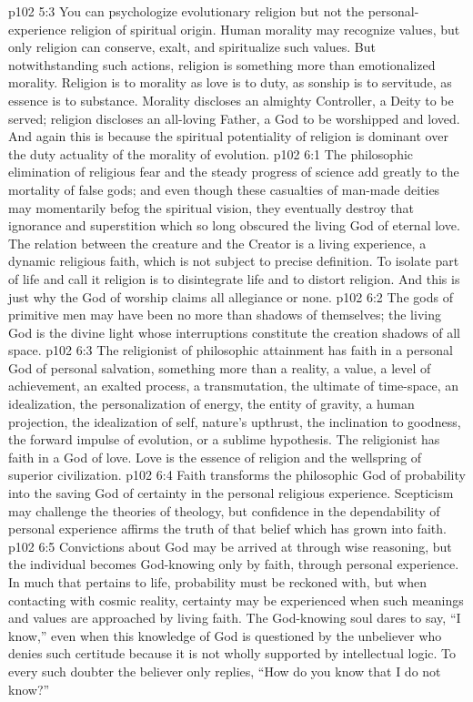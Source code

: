 \vs p102 5:3 You can psychologize evolutionary religion but not the personal\hyp{}experience religion of spiritual origin. Human morality may recognize values, but only religion can conserve, exalt, and spiritualize such values. But notwithstanding such actions, religion is something more than emotionalized morality. Religion is to morality as love is to duty, as sonship is to servitude, as essence is to substance. Morality discloses an almighty Controller, a Deity to be served; religion discloses an all\hyp{}loving Father, a God to be worshipped and loved. And again this is because the spiritual potentiality of religion is dominant over the duty actuality of the morality of evolution.
\vs p102 6:1 The philosophic elimination of religious fear and the steady progress of science add greatly to the mortality of false gods; and even though these casualties of man\hyp{}made deities may momentarily befog the spiritual vision, they eventually destroy that ignorance and superstition which so long obscured the living God of eternal love. The relation between the creature and the Creator is a living experience, a dynamic religious faith, which is not subject to precise definition. To isolate part of life and call it religion is to disintegrate life and to distort religion. And this is just why the God of worship claims all allegiance or none.
\vs p102 6:2 The gods of primitive men may have been no more than shadows of themselves; the living God is the divine light whose interruptions constitute the creation shadows of all space.
\vs p102 6:3 \pc The religionist of philosophic attainment has faith in a personal God of personal salvation, something more than a reality, a value, a level of achievement, an exalted process, a transmutation, the ultimate of time\hyp{}space, an idealization, the personalization of energy, the entity of gravity, a human projection, the idealization of self, nature’s upthrust, the inclination to goodness, the forward impulse of evolution, or a sublime hypothesis. The religionist has faith in a God of love. Love is the essence of religion and the wellspring of superior civilization.
\vs p102 6:4 Faith transforms the philosophic God of probability into the saving God of certainty in the personal religious experience. Scepticism may challenge the theories of theology, but confidence in the dependability of personal experience affirms the truth of that belief which has grown into faith.
\vs p102 6:5 Convictions about God may be arrived at through wise reasoning, but the individual becomes God\hyp{}knowing only by faith, through personal experience. In much that pertains to life, probability must be reckoned with, but when contacting with cosmic reality, certainty may be experienced when such meanings and values are approached by living faith. The God\hyp{}knowing soul dares to say, “I know,” even when this knowledge of God is questioned by the unbeliever who denies such certitude because it is not wholly supported by intellectual logic. To every such doubter the believer only replies, “How do you know that I do not know?”

